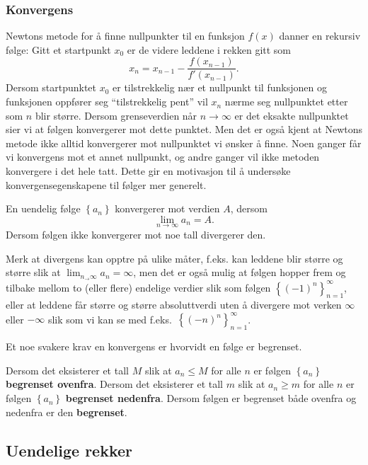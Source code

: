 \documentclass[a4paper,norsk,12pt]{article}
\begin{document}
\subsubsection{Konvergens}
Newtons metode for å finne nullpunkter til en funksjon $f(x)$ danner en rekursiv følge: Gitt et startpunkt $x_0$ er de videre leddene i rekken gitt som
\begin{displaymath}
	x_n = x_{n-1} - \frac{f(x_{n-1})}{f'(x_{n-1})}.
\end{displaymath}
Dersom startpunktet $x_0$ er tilstrekkelig nær et nullpunkt til funksjonen og funksjonen oppfører seg ``tilstrekkelig pent'' vil $x_n$ nærme seg nullpunktet etter som $n$ blir større. Dersom grenseverdien når $n\to\infty$ er det eksakte nullpunktet sier vi at følgen konvergerer mot dette punktet. Men det er også kjent at Newtons metode ikke alltid konvergerer mot nullpunktet vi ønsker å finne. Noen ganger får vi konvergens mot et annet nullpunkt, og andre ganger vil ikke metoden konvergere i det hele tatt. Dette gir en motivasjon til å undersøke konvergensegenskapene til følger mer generelt.
\begin{tdef}
	En uendelig følge $\left\{a_n\right\}$ konvergerer mot verdien $A$, dersom
	\begin{displaymath}
		\lim_{n\to\infty} a_n = A.
	\end{displaymath}
	Dersom følgen ikke konvergerer mot noe tall divergerer den.
\end{tdef}
Merk at divergens kan opptre på ulike måter, f.eks. kan leddene blir større og større slik at $\lim_{n_\to\infty}a_n = \infty$, men det er også mulig at følgen hopper frem og tilbake mellom to (eller flere) endelige verdier slik som følgen $\left\{(-1)^n\right\}_{n=1}^\infty$, eller at leddene får større og større absoluttverdi uten å divergere mot verken $\infty$ eller $-\infty$ slik som vi kan se med f.eks.~$\left\{(-n)^n\right\}_{n=1}^\infty$.

Et noe svakere krav en konvergens er hvorvidt en følge er begrenset. 
\begin{tdef}
	Dersom det eksisterer et tall $M$ slik at $a_n\leq M$ for alle $n$ er følgen $\left\{a_n\right\}$ {\bf begrenset ovenfra}. Dersom det eksisterer et tall $m$ slik at $a_n\geq m$ for alle $n$ er følgen $\left\{a_n\right\}$ {\bf begrenset nedenfra}. Dersom følgen er begrenset både ovenfra og nedenfra er den {\bf begrenset}.
\end{tdef}

\subsection{Uendelige rekker}
\end{document}
